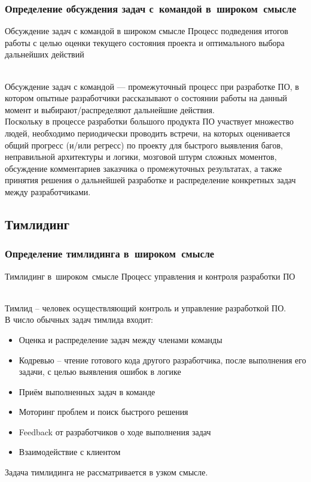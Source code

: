 \documentclass[lecturenotes]{../industrial-development}
\begin{document}
\begin{frame} \frametitle{Определение обсуждения задач с~командой в~широком~смысле}
	\begin{block}{Обсуждение задач с командой в широком смысле}
		Процесс подведения итогов работы с целью оценки текущего состояния проекта и оптимального выбора дальнейших действий
	\end{block}
\end{frame}
\lecturenotes
\\Обсуждение задач с командой --- промежуточный процесс при разработке ПО, в котором опытные разработчики рассказывают о состоянии работы на данный момент и выбирают/распределяют дальнейшие действия.\\
Поскольку в процессе разработки большого продукта ПО участвует множество людей, необходимо периодически проводить встречи, на которых оценивается общий прогресс (и/или регресс) по проекту для быстрого выявления багов, неправильной архитектуры и логики, мозговой штурм сложных моментов, обсуждение комментариев заказчика о промежуточных результатах, а также принятия решения о дальнейшей разработке и распределение конкретных задач между разработчиками. 

\subsection{Тимлидинг}
\begin{frame} \frametitle{Определение тимлидинга в~широком~смысле}
	\begin{block}{Тимлидинг в~широком~смысле}
		Процесс управления и контроля разработки ПО
	\end{block}
\end{frame}
\lecturenotes
\\Тимлид – человек осуществляющий контроль и управление разработкой ПО.\\
В число обычных задач тимлида входит:
\begin{itemize}
	\item Оценка и распределение задач между членами команды 
	\item Кодревью – чтение готового кода другого разработчика, после выполнения его задачи, с целью выявления ошибок в логике
	\item Приём выполненных задач в команде
	\item Моторинг проблем и поиск быстрого решения 
	\item Feedback от разработчиков о ходе выполнения задач
	\item Взаимодействие с клиентом 
\end{itemize}
\vspace{\baselineskip}
Задача тимлидинга не рассматривается в узком смысле.
\end{document}
